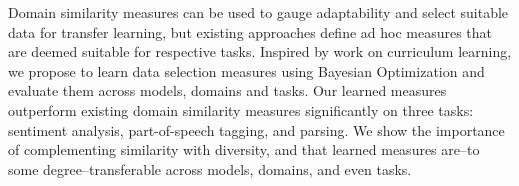Domain similarity measures can be used to gauge adaptability and select suitable data for transfer learning, but existing approaches define ad hoc measures that are deemed suitable for respective tasks. Inspired by work on curriculum learning, we propose to learn data selection measures using Bayesian Optimization and evaluate them across models, domains and tasks. Our learned measures outperform existing domain similarity measures significantly on three tasks: sentiment analysis, part-of-speech tagging, and parsing.  We show the importance of complementing similarity with diversity, and that learned measures are--to some degree--transferable across models, domains, and even tasks.
